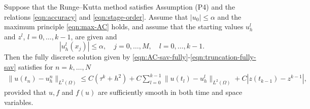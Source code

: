 \documentclass[10pt,final,leqno,onefignum,onetabnum]{siamltex}%
\def\II{(\Omega)}
\begin{document}

\begin{theorem}\label{thm:sav-error}
Suppose that the Runge--Kutta method satisfies Assumption (P4) and the relations \eqref{eqn:accuracy} and \eqref{eqn:stage-order}.
Assume that $|u_0| \le \alpha$ and the maximum principle \eqref{eqn:max-AC} holds,
and assume that the starting values $u_h^l$ and $z^l$, $l=0,\dots,k-1$, are given and
$$
|u_h^l(x_j)|\le \alpha , \quad j=0,\dots,M,\quad l=0,\dots,k-1.
$$
Then the   {fully discrete} solution given by \eqref{eqn:AC-sav-fully}-\eqref{eqn:truncation-fully-sav} satisfies
{for $n=k,\ldots,N$}
\begin{align}\label{fully-err-AC}
  \| u(t_n) - u_h^n \|_{L^2(\Omega)} \le  C(\tau^k + h^{2}) + C\sum_{l=0}^{k-1}
  \| u(t_l) - u_h^l \|_{L^2(\Omega)} + C|z(t_{k-1}) - z^{k-1}| ,
\end{align}
provided that $u, f$ and $f(u)$ are sufficiently smooth in both time and space variables.
\end{theorem}
\end{document}
